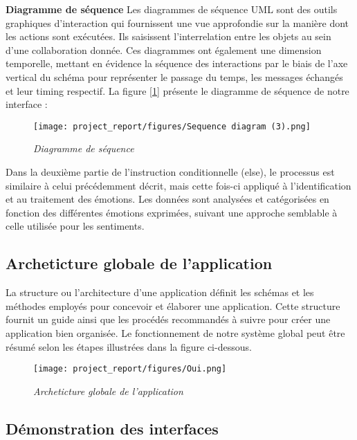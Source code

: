 \textbf{Diagramme de séquence}
Les diagrammes de séquence UML sont des outils graphiques d'interaction qui fournissent une vue approfondie sur la manière dont les actions sont exécutées. Ils saisissent l'interrelation entre les objets au sein d'une collaboration donnée. Ces diagrammes ont également une dimension temporelle, mettant en évidence la séquence des interactions par le biais de l'axe vertical du schéma pour représenter le passage du temps, les messages échangés et leur timing respectif. 
La figure [\ref{fig:figsequence}] présente le diagramme de séquence de notre interface :

\begin{figure}[h]
    \centering
    \texttt{[image: project\_report/figures/Sequence diagram (3).png]}
    \caption{\textit{Diagramme de séquence}}
    \label{fig:figsequence}
\end{figure}


Dans la deuxième partie de l'instruction conditionnelle (else), le processus est similaire à celui précédemment décrit, mais cette fois-ci appliqué à l'identification et au traitement des émotions. Les données sont analysées et catégorisées en fonction des différentes émotions exprimées, suivant une approche semblable à celle utilisée pour les sentiments.
\subsection{Archeticture globale de l'application}
La structure ou l’architecture d'une application définit les schémas et les méthodes employés pour concevoir et élaborer une application. Cette structure fournit un guide ainsi que les procédés recommandés à suivre pour créer une application bien organisée.
Le fonctionnement de notre système global peut être résumé selon les étapes illustrées dans la figure ci-dessous. 
\begin{figure}[h]
    \centering
    \texttt{[image: project\_report/figures/Oui.png]}
    \caption{\textit{Archeticture globale de l'application}}
    \label{fig:arch}
\end{figure}
\subsection{Démonstration des interfaces}
